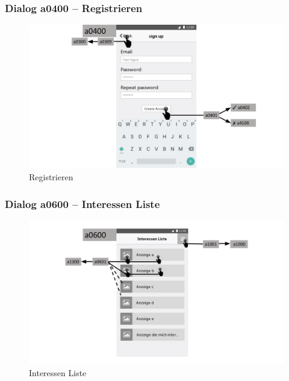 \documentclass[a4paper,12pt,oneside]{scrartcl}
\begin{document}
\subsubsection{Dialog a0400 – Registrieren}
\begin{figure}[!htbp]
\centering
\noindent\includegraphics[width=\linewidth,height=\textheight,keepaspectratio]{Dialoge/a0400}
\caption{Registrieren}
\end{figure}
\FloatBarrier

\subsubsection{Dialog a0600 – Interessen Liste}
\begin{figure}[!htbp]
\centering
\noindent\includegraphics[width=\linewidth,height=\textheight,keepaspectratio]{Dialoge/a0600}
\caption{Interessen Liste}
\end{figure}
\FloatBarrier
\end{document}
